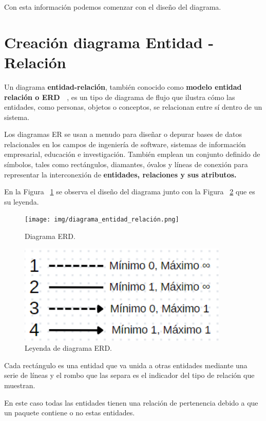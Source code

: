 \documentclass[a4paper, 12pt]{book}
\begin{document}
Con esta información podemos comenzar con el diseño del diagrama.

\section{Creación diagrama Entidad - Relación} 
\label{sec:diagrama_entidad_relacion}
Un diagrama \textbf {entidad-relación}, también conocido como \textbf {modelo entidad relación o ERD ~\cite{lucidchart:_diagramaERD}}, es un tipo de diagrama de flujo que ilustra cómo las entidades, como personas, objetos o conceptos, se relacionan entre sí dentro de un sistema.

Los diagramas ER se usan a menudo para diseñar o depurar bases de datos relacionales en los campos de ingeniería de software, sistemas de información empresarial, educación e investigación. También emplean un conjunto definido de símbolos, tales como rectángulos, diamantes, óvalos y líneas de conexión para representar la interconexión de \textbf {entidades, relaciones y sus atributos.}

En la Figura ~\ref{fig:entidad_relación} se observa el diseño del diagrama junto con la Figura ~\ref{fig:leyenda_diagrama} que es su leyenda.

\begin{figure}[h]
	\centering
	\texttt{[image: img/diagrama\_entidad\_relación.png]}
	\caption{Diagrama ERD.}
	\label{fig:entidad_relación}
\end{figure}

\begin{figure}[h]
	\centering
	\includegraphics[width=10cm, keepaspectratio]{img/Leyenda_diagrama.png}
	\caption{Leyenda de diagrama ERD.}
	\label{fig:leyenda_diagrama}
\end{figure}

Cada rectángulo es una entidad que va unida a otras entidades mediante una serie de líneas y el rombo que las separa es el indicador del tipo de relación que muestran.

En este caso todas las entidades tienen una relación de pertenencia debido a que un paquete contiene o no estas entidades.
\end{document}
